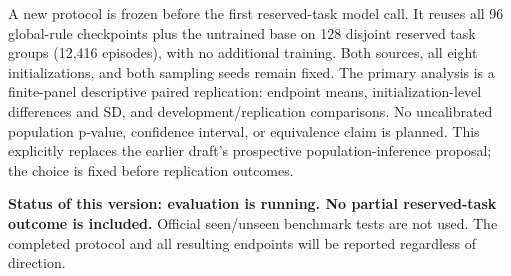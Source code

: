 A new protocol is frozen before the first reserved-task model call. It reuses all 96 global-rule checkpoints plus the untrained base on 128 disjoint reserved task groups (12,416 episodes), with no additional training. Both sources, all eight initializations, and both sampling seeds remain fixed. The primary analysis is a finite-panel descriptive paired replication: endpoint means, initialization-level differences and SD, and development/replication comparisons. No uncalibrated population p-value, confidence interval, or equivalence claim is planned. This explicitly replaces the earlier draft's prospective population-inference proposal; the choice is fixed before replication outcomes.

\textbf{Status of this version: evaluation is running. No partial reserved-task outcome is included.} Official seen/unseen benchmark tests are not used. The completed protocol and all resulting endpoints will be reported regardless of direction.
